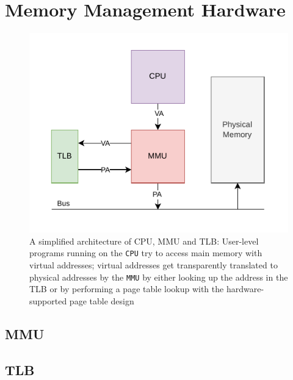 \section{Memory Management Hardware}
\begin{figure}[t]
    \centering
    \includegraphics[scale=1.2]{figures/simple_mmu_arch.pdf}
    \caption[A simplified architecture of CPU, MMU and TLB]{A simplified architecture of CPU, MMU and TLB:
        User-level programs running on the \texttt{CPU} try to access main memory with virtual
        addresses; virtual addresses get transparently translated to physical addresses by the
        \texttt{MMU} by either looking up the address in the TLB or by performing a page table
        lookup with the hardware-supported page table design}
    \label{fig:fund:simplearch}
\end{figure}
\subsection{MMU}
\subsection{TLB}

\cite{jacobVirtualMemoryContemporary1998}



